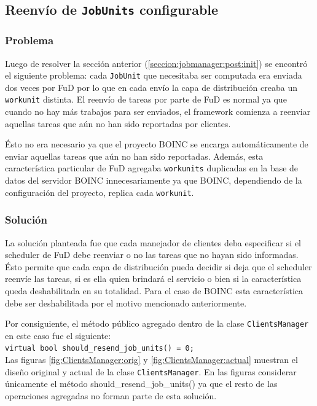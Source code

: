 \subsection{Reenvío de \texttt{JobUnits} configurable}
\label{seccion:reenvio:jobunits}

	\subsubsection{Problema}
Luego de resolver la sección anterior (\ref{seccion:jobmanager:post:init}) se encontró el siguiente problema: cada \texttt{JobUnit} que necesitaba ser computada era enviada dos veces por FuD por lo que en cada envío la capa de distribución creaba un \texttt{workunit} distinta. El reenvío de tareas por parte de FuD es normal ya que cuando no hay más trabajos para ser enviados, el framework comienza a reenviar aquellas tareas que aún no han sido reportadas por clientes.

Ésto no era necesario ya que el proyecto BOINC se encarga automáticamente de enviar aquellas tareas que aún no han sido reportadas. Además, esta característica particular de FuD agregaba \texttt{workunits} duplicadas en la base de datos del servidor BOINC innecesariamente ya que BOINC, dependiendo de la configuración del proyecto, replica cada \texttt{workunit}.

	\subsubsection{Solución}
La solución planteada fue que cada manejador de clientes deba especificar si el scheduler de FuD debe reenviar o no las tareas que no hayan sido informadas. Ésto permite que cada capa de distribución pueda decidir si deja que el scheduler reenvíe las tareas, si es ella quien brindará el servicio o bien si la característica queda deshabilitada en su totalidad. Para el caso de BOINC esta característica debe ser deshabilitada por el motivo mencionado anteriormente.

Por consiguiente, el método público agregado dentro de la clase \texttt{ClientsManager} en este caso fue el siguiente:\\

\texttt{virtual bool should\_resend\_job\_units() = 0;}\\

Las figuras \ref{fig:ClientsManager:orig} y \ref{fig:ClientsManager:actual} muestran el diseño original y actual de la clase \texttt{ClientsManager}. En las figuras considerar únicamente el método should\_resend\_job\_units() ya que el resto de las operaciones agregadas no forman parte de esta solución.

